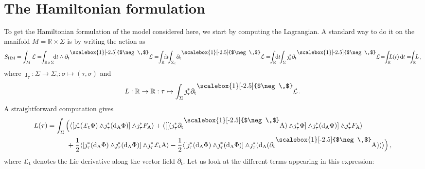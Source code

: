 \documentclass[12pt]{amsart}
\theoremstyle{plain}
\theoremstyle{definition}
\theoremstyle{remark}
\newcommand{\iprod}{\raisebox{8pt}{\scalebox{1}[-2.5]{$\neg\,$}}}
\newcommand{\wed}{\wedge\hspace*{-7.5pt}.\hspace*{3pt}}
\numberwithin{equation}{section}  %
\begin{document}
%
%
\section{The Hamiltonian formulation}{\label{sec_hamiltonian}}

To get the Hamiltonian formulation of the model considered here, we start by computing the Lagrangian. A standard way to do it on the manifold $M =\mathbb{R}\times\Sigma$ is by writing the action as
\[
S_{\mathrm{HM}}=\int_{M }\mathcal{L}=\!\!\int_{\mathbb{R}\times\Sigma}\!\!\mathrm{d}t\wedge\partial_{\mathrm{t}}\iprod\mathcal{L}=\!\!\int_{\mathbb{R}}\!\!\mathrm{d}t\!\!\int_{\Sigma_t} \!\partial_{\mathrm{t}}\iprod\mathcal{L}
=\!\!\int_{\mathbb{R}}\!\!\mathrm{d}t\!\!\int_{\Sigma}\jmath_t^*\partial_{\mathrm{t}}\iprod\mathcal{L}\!=\!\!\int_{\mathbb{R}}\!\!\!L(t)\,\mathrm{d}t =\!\!\!\int_{\mathbb{R}}\!\!L\,,
\]
where $\jmath_\tau:\Sigma\rightarrow\Sigma_\tau:\sigma\mapsto(\tau,\sigma)$ and
\[
L:\mathbb{R}\rightarrow \mathbb{R}:\tau\mapsto\int_\Sigma \jmath_\tau^*\partial_{\mathrm{t}}\iprod\mathcal{L}\,.
\]
A straightforward computation gives
\begin{align*}
  L(\tau)  & =\int_\Sigma \Big(\langle [\jmath_\tau^*(\pounds_{\mathrm{t}}\Phi)\wed \jmath_\tau^*(\mathrm{d}_\mathrm{A}\Phi)]\wed \jmath_\tau^*F_{\mathrm{A}} \rangle +\langle [[(\jmath_\tau^*\partial_{\mathrm{t}}\iprod \mathrm{A})\wed \jmath_\tau^*\Phi]\wed\jmath_\tau^*(\mathrm{d}_\mathrm{A}\Phi)]\wed \jmath_\tau^* F_\mathrm{A}\rangle \\
   &\hspace*{10mm}+\frac{1}{2}\langle [ \jmath_\tau^*(\mathrm{d}_\mathrm{A}\Phi)  \wed \jmath_\tau^*(\mathrm{d}_\mathrm{A}\Phi)]\wed \jmath_\tau^*\pounds_{\mathrm{t}}\mathrm{A}\rangle-\frac{1}{2}\langle  [ \jmath_\tau^*(\mathrm{d}_\mathrm{A}\Phi) \wed \jmath_\tau^*(\mathrm{d}_\mathrm{A}\Phi)]\wed \jmath_\tau^*(\mathrm{d}_\mathrm{A}(\partial_{\mathrm{t}}\iprod \mathrm{A}) )\rangle\Big)\,,
\end{align*}
where $\pounds_{\mathrm{t}}$ denotes the Lie derivative along the vector field $\partial_{\mathrm{t}}$. Let us look at the different terms appearing in this expression:

\medskip
\end{document}
